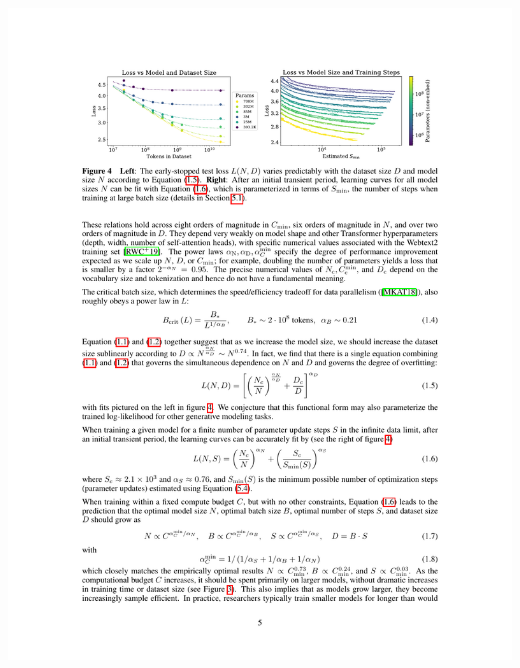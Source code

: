 \documentclass[9pt]{report}
\begin{document}
{\begin{itemize}
  \includegraphics[height=0.6\textheight]{img/loss-vs-model-dataset-size.pdf}
\end{itemize}

}
\end{document}
